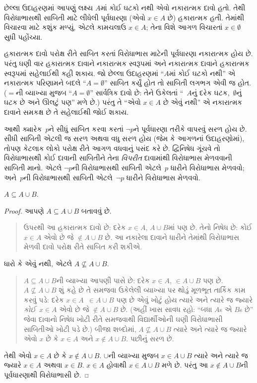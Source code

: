 છેલ્લા ઉદાહરણમાં આપણું લક્ષ્ય $A$માં કોઈ ઘટકો નથી એવો
નકારાત્મક દાવો હતો. તેથી વિરોધાભાસથી સાબિતી માટે લીધેલી
પૂર્વધારણા (એવો $x \in A$ છે) હકારાત્મક હતી. તેમાંથી વિચારવા
માટે કશુંક મળ્યું, એટલે કામચલાઉ $x \in A$; તેના વિશે આગળ
વિચારતાં $x \in \emptyset$ સુધી પહોંચ્યા.

હકારાત્મક દાવો પરોક્ષ રીતે સાબિત કરતાં વિરોધાભાસ માટેની
પૂર્વધારણા નકારાત્મક હોય છે. પરંતુ ઘણી વાર હકારાત્મક દાવાને
નકારાત્મક સ્વરૂપમાં અને નકારાત્મક દાવાને હકારાત્મક સ્વરૂપમાં
સહેલાઈથી કહી શકાય. જો છેલ્લા ઉદાહરણમાં ``$A$માં કોઈ
ઘટકો નથી'' એ નકારાત્મક પરિણામને બદલે ``$A = \emptyset$''
સાબિત કર્યું હોત તો સાબિતી લગભગ એવી જ હોત. ($=$ની વ્યાખ્યા
મુજબ ``$A = \emptyset$'' સાર્વત્રિક દાવો છે: તેને ઉકેલતાં
``~$A$નું દરેક ઘટક,~$\emptyset$નું ઘટક છે
અને ઊલટું પણ'' મળે છે.) પરંતુ તે ``એવો $x \in A$ છે
એવું નથી'' એ નકારાત્મક દાવાને સમકક્ષ છે તે સહેલાઈથી જોઈ શકાય.

આથી ક્યારેક~$p$ને સીધું સાબિત કરવા કરતાં $\lnot p$ને
પૂર્વધારણા તરીકે વાપરવું સરળ હોય છે. સીધી સાબિતી એટલી જ સરળ
અથવા વધુ સરળ હોય (જેમ કે આગળનાં ઉદાહરણોમાં), તોપણ કેટલાક
લોકો પરોક્ષ રીતે આગળ વધવાનું પસંદ કરે છે. દ્વિનિષેધ ગૂંચવે તો
વિરોધાભાસથી કોઈ દાવાની સાબિતીને તેના \emph{વિપરીત} દાવામાંથી
વિરોધાભાસ મેળવવાની સાબિતી માનો. એટલે $\lnot
p$ની વિરોધાભાસથી સાબિતી એટલે~$p$ ધારીને વિરોધાભાસ મેળવવો;
અને~$p$ની વિરોધાભાસથી સાબિતી એટલે~$\lnot p$ ધારીને
વિરોધાભાસ મેળવવો.

\begin{prop}
$A \subseteq A \cup B$.
\end{prop}

\begin{proof}
  આપણે $A \subseteq A \cup B$ બતાવવું છે.
  \begin{quote}
    ઉપરથી આ હકારાત્મક દાવો છે: દરેક $x \in A$, $A \cup B$માં
    પણ છે. તેનો નિષેધ છે: કોઈ $x \in A$ એવો છે જે
    $\notin A \cup B$ છે. આ નકારેલા દાવાને ધારીને તેમાંથી
    વિરોધાભાસ મેળવી દાવો પરોક્ષ રીતે સાબિત કરી શકીએ.
    \end{quote}
  ધારો કે એવું નથી, એટલે $A \nsubseteq A \cup B$.
  \begin{quote}
    $A \subseteq A \cup B$ની વ્યાખ્યા આપણી પાસે છે: દરેક
    $x \in A$, $\in A \cup B$ પણ છે. $A \nsubseteq A \cup B$
    શું કહે છે તે સમજવા ઉકેલેલી વ્યાખ્યા પર થોડું મૂળભૂત તાર્કિક
    કામ કરવું પડે: દરેક $x \in A$~$\in
    A \cup B$ પણ છે એવું ખોટું હોય ત્યારે અને ત્યારે જ જ્યારે
    \emph{કોઈ}~$x \in A$ એવો છે જે $\notin A \cup B$ છે.
     (અહીં ખાસ સાવધ રહો: ``બધા $A$s
    એ $B$s છે'' જેવા દાવાનો નિષેધ ખોટી રીતે સમજવાથી
    વિદ્યાર્થીઓની ઘણી વિરોધાભાસી સાબિતીઓ ખોટી પડે છે.)
    બીજા શબ્દોમાં, $A \nsubseteq A \cup B$ ત્યારે અને ત્યારે જ
    જ્યારે એવો $x$ છે કે $x \in A$ અને $x \notin A \cup B$.
    પછીનું સરળ છે.
  \end{quote}
  તેથી એવો $x \in A$ છે કે $x \notin A \cup B$. $\cup$ની
  વ્યાખ્યા મુજબ $x \in A \cup B$ ત્યારે અને ત્યારે જ જ્યારે
  $x \in A$ અથવા $x \in
  B$. $x \in A$ હોવાથી $x \in A \cup B$ મળે છે. પરંતુ આ
  $x \notin A \cup B$ની પૂર્વધારણાથી વિરોધાભાસી છે.
\end{proof}

